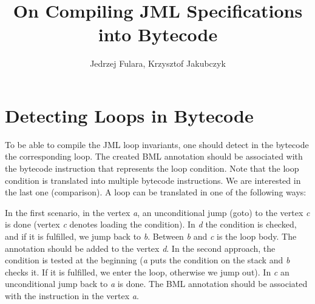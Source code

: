 \documentclass{article}
\author{Jedrzej Fulara, Krzysztof Jakubczyk}
\title{On Compiling JML Specifications into Bytecode}
\begin{document}
\maketitle
\section{Detecting Loops in Bytecode}
To be able to compile the JML loop invariants, one should detect in the bytecode the corresponding loop. The created BML annotation should be associated with the bytecode instruction that represents the loop condition. Note that the loop condition is translated into multiple bytecode instructions. We are interested in the last one (comparison). A loop can be translated in one of the following ways:
\begin{center}
\end{center}
In the first scenario, in the vertex \textit{a}, an unconditional jump (goto) to the vertex \textit{c} is done (vertex \textit{c} denotes loading the condition). In \textit{d} the condition is checked, and if it is fulfilled, we jump back to \textit{b}. Between \textit{b} and \textit{c} is the loop body. The annotation should be added to the vertex \textit{d}. In the second approach, the condition is tested at the beginning (\textit{a} puts the condition on the stack and \textit{b} checks it. If it is fulfilled, we enter the loop, otherwise we jump out). In \textit{c} an unconditional jump back to \textit{a} is done. The BML annotation should be associated with the instruction in the vertex \textit{a}.
\end{document}
